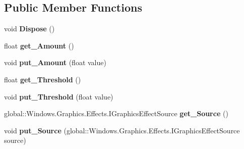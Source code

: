 \subsection*{Public Member Functions}
\begin{DoxyCompactItemize}
\item 
\mbox{\label{class_microsoft_1_1_graphics_1_1_canvas_1_1_effects_1_1_sharpen_effect_ab80afd02393c881baccb9ee076f0e68a}} 
void {\bfseries Dispose} ()
\item 
\mbox{\label{class_microsoft_1_1_graphics_1_1_canvas_1_1_effects_1_1_sharpen_effect_aa474bc9966d9aebafd4d25b60af032b6}} 
float {\bfseries get\+\_\+\+Amount} ()
\item 
\mbox{\label{class_microsoft_1_1_graphics_1_1_canvas_1_1_effects_1_1_sharpen_effect_aeee519576168a556c0566065630c0937}} 
void {\bfseries put\+\_\+\+Amount} (float value)
\item 
\mbox{\label{class_microsoft_1_1_graphics_1_1_canvas_1_1_effects_1_1_sharpen_effect_a0320c466d500b7944352011eb677edc0}} 
float {\bfseries get\+\_\+\+Threshold} ()
\item 
\mbox{\label{class_microsoft_1_1_graphics_1_1_canvas_1_1_effects_1_1_sharpen_effect_a5f9d61f44f74075ed5a77d67e501fc4f}} 
void {\bfseries put\+\_\+\+Threshold} (float value)
\item 
\mbox{\label{class_microsoft_1_1_graphics_1_1_canvas_1_1_effects_1_1_sharpen_effect_a7bcfebcb9e3ceafcbf99dfeb3b9de323}} 
global\+::\+Windows.\+Graphics.\+Effects.\+I\+Graphics\+Effect\+Source {\bfseries get\+\_\+\+Source} ()
\item 
\mbox{\label{class_microsoft_1_1_graphics_1_1_canvas_1_1_effects_1_1_sharpen_effect_a12f91abb56e7ae6922c9313a4e00dfde}} 
void {\bfseries put\+\_\+\+Source} (global\+::\+Windows.\+Graphics.\+Effects.\+I\+Graphics\+Effect\+Source source)

\end{DoxyCompactItemize}
